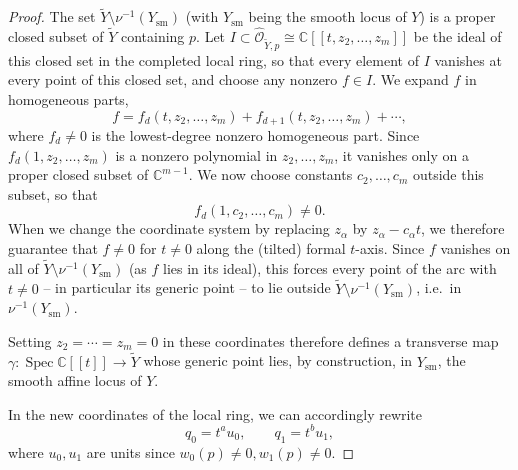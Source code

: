 \documentclass[11pt]{amsart}
\numberwithin{equation}{section}
\theoremstyle{plain}
\theoremstyle{remark}
\begin{document}
\begin{proof}
The set $\widetilde Y\setminus\nu^{-1}(Y_{\mathrm{sm}})$ (with $Y_{\mathrm{sm}}$ being the smooth locus of $Y$) is a proper closed subset of $\widetilde Y$ containing $p$. Let $I\subset
\widehat{\mathcal O}_{\widetilde Y,p}\cong\mathbb C[[t,z_2,\ldots,z_m]]$ be
the ideal of this closed set in the completed local ring, so that every element of $I$ vanishes at every point of this closed set, and choose any
nonzero $f\in I$. We expand $f$ in homogeneous parts,
\[ f = f_d(t,z_2,\ldots,z_m) + f_{d+1}(t,z_2,\ldots,z_m) + \cdots,\]
where $f_d\ne0$ is the lowest-degree nonzero homogeneous part. Since
$f_d(1,z_2,\ldots,z_m)$ is a nonzero polynomial in $z_2,\ldots,z_m$, it
vanishes only on a proper closed subset of $\mathbb C^{m-1}$. We now choose
constants $c_2,\ldots,c_m$ outside this subset, so that
\[f_d(1,c_2,\ldots,c_m)\ne0.\] When we change the coordinate system by replacing $z_\alpha$ by
$z_\alpha-c_\alpha t$, we therefore guarantee that $f\ne0$ for $t\ne0$
along the (tilted) formal $t$-axis. Since $f$ vanishes on all of
$\widetilde Y\setminus\nu^{-1}(Y_{\mathrm{sm}})$ (as $f$ lies in its
ideal), this forces every point of the arc with $t\ne0$ -- in particular
its generic point -- to lie outside $\widetilde Y\setminus
\nu^{-1}(Y_{\mathrm{sm}})$, i.e.\ in $\nu^{-1}(Y_{\mathrm{sm}})$.

Setting $z_2=\cdots=z_m=0$ in these coordinates therefore defines a
transverse map $\gamma:\operatorname{Spec}\mathbb C[[t]]\to\widetilde Y$
whose generic point lies, by construction, in $Y_{\mathrm{sm}}$, the smooth
affine locus of $Y$.

In the new coordinates of the local ring, we can accordingly rewrite
\begin{equation} q_0=t^au_0,\qquad q_1=t^bu_1,
 \label{eq:q-orders}\end{equation}
where $u_0,u_1$ are units since $w_0(p)\neq 0, w_1(p)\neq 0$.


\end{proof}
\end{document}

